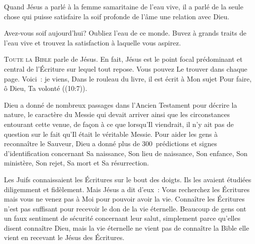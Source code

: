 Quand Jésus a parlé à la femme samaritaine de l'eau vive,
 il a parlé de la seule chose qui puisse satisfaire
 la soif profonde de l'âme \ocadr une relation avec Dieu.

Avez-vous soif aujourd'hui? Oubliez l'eau de ce monde.
 Buvez à grands traits de l'eau vive et trouvez la satisfaction
 à laquelle vous aspirez.

\dvrule






\lettrine{T}{oute la Bible} parle de Jésus.
 En fait, Jésus est le point focal prédominant et central de l'Écriture
 sur lequel tout repose. Vous pouvez Le trouver dans chaque page.
 \og Voici~: je viens, \ocadr Dans le rouleau du livre,
 il est écrit à Mon sujet \fcadr{}
 Pour faire, ô Dieu, Ta volonté \fg{} ((10:7)).

Dieu a donné de nombreux passages dans l'Ancien Testament
 pour décrire la nature, le caractère du Messie qui devait arriver
 ainsi que les circonstances entourant cette venue, de façon à ce que
 lorsqu'Il viendrait, il n'y ait pas de question sur le fait qu'Il était
 le véritable Messie. Pour aider les gens à reconnaître le Sauveur,
 Dieu a donné plus de 300~prédictions et signes d'identification
 concernant Sa naissance, Son lieu de naissance, Son enfance,
 Son ministère, Son rejet, Sa mort et Sa résurrection.


Les Juifs connaissaient les Écritures sur le bout des doigts.
 Ils les avaient étudiées diligemment et fidèlement.
 Mais Jésus a dit d'eux~: 
 \og Vous recherchez les Écritures mais vous ne venez pas à Moi
 pour pouvoir avoir la vie. \fg{}
 Connaître les Écritures n'est pas suffisant pour recevoir
 le don de la vie éternelle. Beaucoup de gens ont un faux sentiment
 de sécurité concernant leur salut, simplement parce qu'elles disent
 connaître Dieu, mais la vie éternelle ne vient pas de connaître la Bible
 \ocadr elle vient en recevant le Jésus des Écritures.


